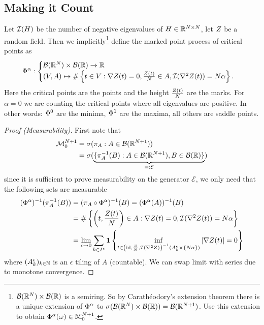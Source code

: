 \subsection{Making it Count}

\begin{definition}
	Let \(\negEV(H)\) be the number of negative eigenvalues of
	\(H\in\real^{\dimension\times\dimension}\), let \(\rf\) be a random field.
	Then we implicitly\footnote{
		\(\borel(\real^\dimension)\times\borel(\real)\) is a semiring. So by
		Carathéodory's extension theorem there is a unique extension of
		\(\crit^\alpha\) to
		\(\sigma(\borel(\real^\dimension)\times\borel(\real))=\borel(\real^{\dimension+1})\).
		Use this extension to obtain \(\crit^\alpha(\omega)\in\locFiniteMeasure[\dimension+1]\).
	} define the marked point process of critical points as
	\begin{align*}
		\crit^\alpha:
		\begin{cases}
			\borel(\real^\dimension)\times\borel(\real) \to \real\\
			(\Vol, A) \mapsto
			\#\left\{t\in\Vol:
				\nabla\rf(t)=0,
				\frac{\rf(t)}{\dimension}\in A,
				\negEV(\nabla^2 \rf(t))=\dimension\alpha
			\right\}.
		\end{cases}
	\end{align*}
	Here the critical points are the points and the height \(\frac{\rf(t)}\dimension\)
	are the marks. For \(\alpha=0\) we are counting the critical points where all
	eigenvalues are positive. In other words: \(\crit^0\) are the minima,
	\(\crit^1\) are the maxima, all others are saddle points.
\end{definition}
\begin{proof}[Proof (Measurability)]
	First note that	
	\begin{align*}
		\locFiniteMeasAlg[\dimension+1]
		&= \sigma(\pi_A : A\in\borel(\real^{\dimension+1}))\\
		&=\sigma(\underbrace{
			\{\pi_A^{-1}(B) : A\in\borel(\real^{\dimension+1}), B\in\borel(\real)\}
		}_{=:\mathcal{E}}
		)
	\end{align*}
	since it is sufficient to prove measurability on the generator
	\(\mathcal{E}\), we only need that the following sets are measurable
	\begin{align*}
		(\crit^\alpha)^{-1}(\pi^{-1}_{ A }(B))
		&= (\pi_{A} \circ \crit^\alpha)^{-1}(B)
		= (\crit^\alpha(A))^{-1}(B)\\
		&= \#\left\{\left(t,\frac{\rf(t)}{\dimension}\right) \in A:
			\nabla\rf(t)=0,
			\negEV(\nabla^2 \rf(t))=\dimension\alpha
		\right\}\\
		&= \lim_{\epsilon\to 0} \sum_{k\in I^\epsilon}
		\ind\left\{
			\inf_{t\in \left(\text{id}, \frac{\rf}\dimension, \negEV(\nabla^2\rf)\right)^{-1}(A^\epsilon_k\times \{\dimension\alpha\}) }
		|\nabla \rf(t)| = 0
		\right\}
	\end{align*}
	where \((A^\epsilon_k)_{k\in\nat}\) is an \(\epsilon\) tiling of \(A\) (countable).
	We can swap limit with series due to monotone convergence.
\end{proof}

